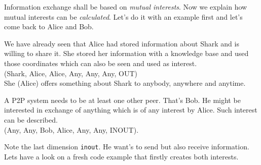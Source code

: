 Information exchange shall be based on {\it mutual interests}. Now we explain how mutual interests can be {\it calculated}. Let's do it with an example first and let's come back to Alice and Bob.

We have already seen that Alice had stored information about Shark and is willing to share it. She stored her information with a knowledge base and used those coordinates which can also be seen and used as interest.\\
(Shark, Alice, Alice, Any, Any, Any, OUT)\\
She (Alice) offers something about Shark to anybody, anywhere and anytime.

A P2P system needs to be at least one other peer. That's Bob. He might be interested in exchange of anything which is of any interest by Alice. Such interest can be described.\\
(Any, Any, Bob, Alice, Any, Any, INOUT).

Note the last dimension {\tt inout}. He want's to send but also receive  information. Lets have a look on a fresh code example that firstly creates both interests.

